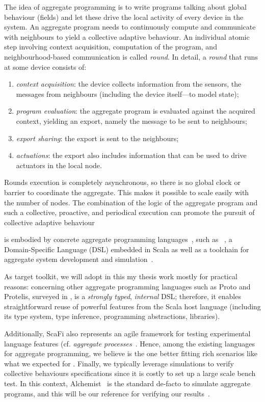 \documentclass[11pt]{article}
\begin{document}
The idea of aggregate programming is to write programs talking about global behaviour (fields) and let these drive the local activity of every device in the system.
%
An aggregate program needs to continuously compute and communicate with neighbours to yield a collective adaptive behaviour.
%
An individual atomic step involving context acquisition, computation of the program, and neighbourhood-based communication is called \emph{round}.
%
In detail, a \emph{round} that runs at some device consists of:
\begin{enumerate}
  \item \emph{context acquisition}: the device collects information from the sensors, the messages from neighbours (including the device itself---to model state);
  \item \emph{program evaluation}: the aggregate program is evaluated against the acquired context, yielding an export, namely the message to be sent to neighbours;
  \item \emph{export sharing}: the export is sent to the neighbours;
  \item \emph{actuations}: the export also includes information that can be used to drive actuators in the local node.
\end{enumerate}

Rounds execution is completely asynchronous, so there is no global clock or barrier to coordinate the aggregate. This makes it possible to scale easily with the number of nodes. 
%
The combination of the logic of the aggregate program and such a collective, proactive, and periodical execution can promote the pursuit of collective adaptive behaviour

\ac{} is embodied by concrete aggregate programming languages~\cite{viroli2019jlamp-si-coord},
 such as \scafi{}~\cite{DBLP:conf/isola/CasadeiVAD20,DBLP:journals/eaai/CasadeiVAPD21},
 a Domain-Specific Language (DSL) embedded in Scala
 as well as a toolchain for aggregate system development and simulation~\cite{Casadei2016mass}.
%

As target toolkit, we will adopt \scafi{} in this my thesis work mostly for practical reasons: concerning other aggregate programming languages such as Proto and Protelis, surveyed in \cite{viroli2019jlamp-si-coord},
\scafi{} is a \emph{strongly typed}, \emph{internal} DSL; therefore, it enables straightforward reuse of powerful features from the Scala host language (including its type system, type inference, programming abstractions, libraries).

Additionally, ScaFi also represents an agile framework for testing experimental language features (cf. \emph{aggregate processes}~\cite{DBLP:journals/eaai/CasadeiVAPD21}.
%
Hence, among the existing languages for aggregate programming, we believe \scafi{} is the one better fitting rich scenarios like what we expected for \cpsw{}.
%
Finally, we typically leverage simulations to verify collective behaviours specifications since it is costly to set up a large scale bench test. In this context, Alchemist~\cite{} is the standard de-facto to simulate aggregate programs, and this will be our reference for verifying our results~\cite{Pianini_2013}.
\end{document}
